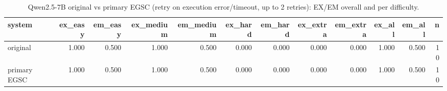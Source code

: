 \begin{table}[htbp]
\caption{Qwen2.5-7B original vs primary EGSC (retry on execution error/timeout, up to 2 retries): EX/EM overall and per difficulty.}
\label{tab:task3_egsc_main}
\begin{tabular}{lrrrrrrrrrrr}
\toprule
system & ex\_easy & em\_easy & ex\_medium & em\_medium & ex\_hard & em\_hard & ex\_extra & em\_extra & ex\_all & em\_all & n \\
\midrule
original & 1.000 & 0.500 & 1.000 & 0.500 & 0.000 & 0.000 & 0.000 & 0.000 & 1.000 & 0.500 & 10 \\
primary EGSC & 1.000 & 0.500 & 1.000 & 0.500 & 0.000 & 0.000 & 0.000 & 0.000 & 1.000 & 0.500 & 10 \\
\bottomrule
\end{tabular}
\end{table}
